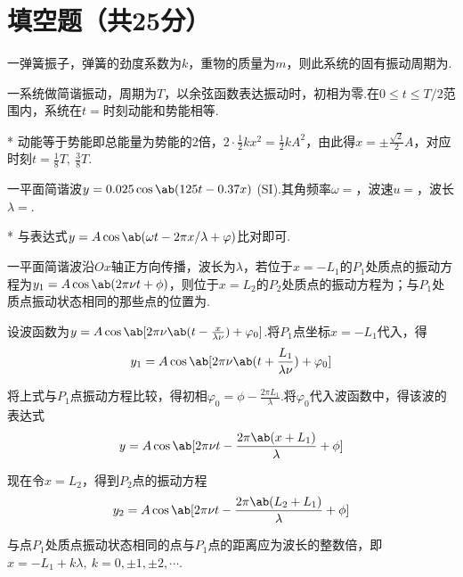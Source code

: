 \section{填空题（共25分）}
\begin{problem}[弹簧振子][3]
一弹簧振子，弹簧的劲度系数为$k$，重物的质量为$m$，则此系统的固有振动周期为.
\end{problem}

\begin{problem}[简谐振动][4]
    一系统做简谐振动，周期为$T$，以余弦函数表达振动时，初相为零.在$0\leq t\leq T/2$范围内，系统在$t=$时刻动能和势能相等.
\end{problem}
\begin{solution}*
    动能等于势能即总能量为势能的$2$倍，$2\cdot\frac{1}{2}kx^2=\frac{1}{2}kA^2$，由此得$x=\pm\frac{\sqrt{2}}{2}A$，对应时刻$t=\frac{1}{8}T,\ \frac{3}{8}T$.
\end{solution}

\begin{problem}[平面简谐波的物理量][4]
    一平面简谐波$y=0.025\cos{\ab(125t-0.37x)}$ (SI).其角频率$\omega=$，波速$u=$，波长$\lambda=$.
\end{problem}
\begin{solution}*
    与表达式$y=A\cos\ab(\omega t-2\pi x/\lambda+\varphi)$比对即可.
\end{solution}

\begin{problem}[平面简谐波的波函数][5]
    一平面简谐波沿$Ox$轴正方向传播，波长为$\lambda$，若位于$x=-L_1$的$P_1$处质点的振动方程为$y_1=A\cos\ab(2\pi\nu t+\phi)$，则位于$x=L_2$的$P_2$处质点的振动方程为；与$P_1$处质点振动状态相同的那些点的位置为.
\end{problem}
\begin{solution}
    设波函数为$y=A\cos\ab[2\pi\nu\ab(t-\frac{x}{\lambda\nu})+\varphi_0]$.将$P_1$点坐标$x=-L_1$代入，得
    \[y_1=A\cos\ab[2\pi\nu\ab(t+\frac{L_1}{\lambda\nu})+\varphi_0]\]

    将上式与$P_1$点振动方程比较，得初相$\varphi_0=\phi-\frac{2\pi L_1}{\lambda}$.将$\varphi_0$代入波函数中，得该波的表达式
    \[y=A\cos\ab[2\pi\nu t-\frac{2\pi\ab(x+L_1)}{\lambda}+\phi]\]

    现在令$x=L_2$，得到$P_2$点的振动方程
    \[y_2=A\cos\ab[2\pi\nu t-\frac{2\pi\ab(L_2+L_1)}{\lambda}+\phi]\]

    与点$P_1$处质点振动状态相同的点与$P_1$点的距离应为波长的整数倍，即$x=-L_1+k\lambda,\ k=0,\pm 1,\pm 2,\cdots$.
\end{solution}

